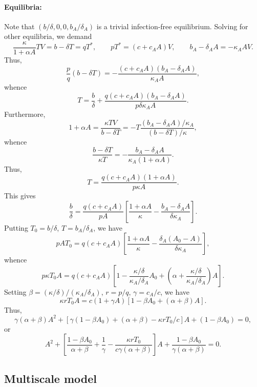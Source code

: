 \documentclass[11pt]{article}
\begin{document}
    \paragraph{Equilibria:} Note that $(b / \delta, 0, 0, b_A / \delta_A)$ is
    a trivial infection-free equilibrium. Solving for other equilibria, we
    demand \[
        \frac{\kappa}{1 + \alpha A} TV = b - \delta T = q T^*, \qquad
        pT^* = (c + c_A A)V, \qquad
        b_A - \delta_AA = -\kappa_A AV.
    \] Thus, \[
        \frac{p}{q}(b - \delta T) = -\frac{(c + c_A A)(b_A - \delta_A A)}{\kappa_A A},
    \] whence \[
        T = \frac{b}{\delta} + \frac{q(c + c_A A)(b_A - \delta_A A)}{p \delta \kappa_A A}.
    \] Furthermore, \[
        1 + \alpha A = \frac{\kappa TV}{b - \delta T} = -T \frac{(b_A - \delta_A A) / \kappa_A}{(b - \delta T) / \kappa},
    \] whence \[
        \frac{b - \delta T}{\kappa T} = - \frac{b_A - \delta_A A}{\kappa_A (1 + \alpha A)}.
    \] Thus, \[
        T  = \frac{q(c + c_A A)(1 + \alpha A)}{p\kappa A}.
    \] This gives \[
        \frac{b}{\delta} = \frac{q(c + c_A A)}{pA}\left[\frac{1 + \alpha A}{\kappa} - \frac{b_A - \delta_A A}{\delta \kappa_A}\right].
    \] Putting $T_0 = b / \delta$, $T = b_A / \delta_A$, we have \[
        pAT_0 = q(c + c_A A)\left[\frac{1 + \alpha A}{\kappa} - \frac{\delta_A(A_0 - A)}{\delta \kappa_A}\right],
    \] whence \[
        p\kappa T_0 A
        = q(c + c_A A)\left[1 - \frac{\kappa/\delta}{\kappa_A/\delta_A}A_0 + \left(\alpha + \frac{\kappa / \delta}{\kappa_A / \delta_A}\right)A\right].
    \] Setting $\beta = (\kappa / \delta) / (\kappa_A / \delta_A)$, $r = p /
    q$, $\gamma = c_A / c$, we have \[
        \kappa r T_0 A = c(1 + \gamma A)[1 - \beta A_0 + (\alpha + \beta)A].
    \] Thus, \[
        \gamma(\alpha + \beta)A^2 + [\gamma(1 - \beta A_0) + (\alpha + \beta) - \kappa r T_0 / c] A + (1 - \beta A_0) = 0,
    \] or \[
        A^2 + \left[\frac{1 - \beta A_0}{\alpha + \beta} + \frac{1}{\gamma} - \frac{\kappa r T_0}{c\gamma(\alpha + \beta)}\right] A + \frac{1 - \beta A_0}{\gamma(\alpha + \beta)} = 0.
    \]


    \subsection{Multiscale model}
\end{document}
